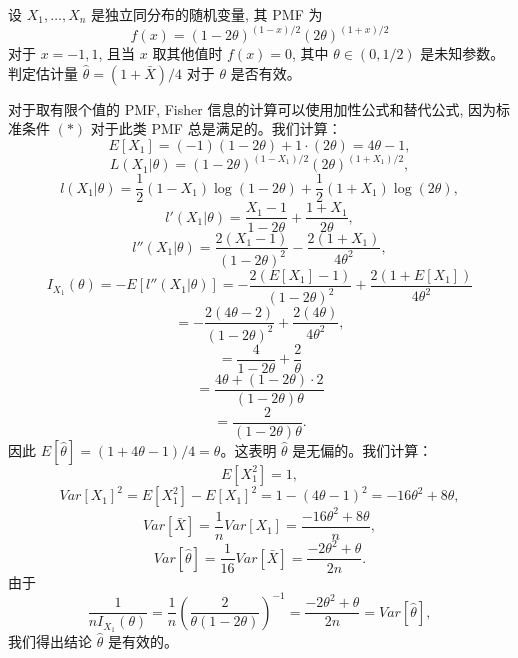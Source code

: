 \begin{questions}
\question
设 $X_1, \dots, X_n$ 是独立同分布的随机变量, 其 PMF 为
\[
f(x) = (1 - 2\theta)^{(1 - x)/2} (2\theta)^{(1 + x)/2}
\]
对于 $x = -1, 1$, 且当 $x$ 取其他值时 $f(x) = 0$, 其中 $\theta \in (0, 1/2)$ 是未知参数。判定估计量 $\hat{\theta} = (1 + \bar{X})/4$ 对于 $\theta$ 是否有效。

\begin{solution}
对于取有限个值的 PMF, Fisher 信息的计算可以使用加性公式和替代公式, 因为标准条件 $(*)$ 对于此类 PMF 总是满足的。我们计算：
\[
E[X_1] = (-1)(1 - 2\theta) + 1 \cdot (2\theta) = 4\theta - 1,
\]
\[
L(X_1 | \theta) = (1 - 2\theta)^{(1 - X_1)/2} (2\theta)^{(1 + X_1)/2},
\]
\[
l(X_1 | \theta) = \frac{1}{2}(1 - X_1) \log(1 - 2\theta) + \frac{1}{2}(1 + X_1) \log(2\theta),
\]
\[
l'(X_1 | \theta) = \frac{X_1 - 1}{1 - 2\theta} + \frac{1 + X_1}{2\theta},
\]
\[
l''(X_1 | \theta) = \frac{2(X_1 - 1)}{(1 - 2\theta)^2} - \frac{2(1 + X_1)}{4\theta^2},
\]
\[
I_{X_1}(\theta) = -E[l''(X_1 | \theta)] = -\frac{2(E[X_1] - 1)}{(1 - 2\theta)^2} + \frac{2(1 + E[X_1])}{4\theta^2}
\]
\[
= -\frac{2(4\theta - 2)}{(1 - 2\theta)^2} + \frac{2(4\theta)}{4\theta^2},
\]
\[
= \frac{4}{1 - 2\theta} + \frac{2}{\theta}
\]
\[
= \frac{4\theta + (1 - 2\theta) \cdot 2}{(1 - 2\theta)\theta}
\]
\[
= \frac{2}{(1 - 2\theta)\theta}.
\]
因此 $E[\hat{\theta}] = (1 + 4\theta - 1)/4 = \theta$。这表明 $\hat{\theta}$ 是无偏的。我们计算：
\[
E[X_1^2] = 1,
\]
\[
Var[X_1]^2 = E[X_1^2] - E[X_1]^2 = 1 - (4\theta - 1)^2 = -16\theta^2 + 8\theta,
\]
\[
Var[\bar{X}] = \frac{1}{n} Var[X_1] = \frac{-16\theta^2 + 8\theta}{n},
\]
\[
Var[\hat{\theta}] = \frac{1}{16} Var[\bar{X}] = \frac{-2\theta^2 + \theta}{2n}.
\]
由于
\[
\frac{1}{n I_{X_1}(\theta)} = \frac{1}{n} \left( \frac{2}{\theta(1 - 2\theta)} \right)^{-1} = \frac{-2\theta^2 + \theta}{2n} = Var[\hat{\theta}],
\]
我们得出结论 $\hat{\theta}$ 是有效的。
\end{solution}

\question
{}
\end{questions}
